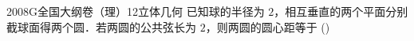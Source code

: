 
\begin{problem}{2008}{G}{全国大纲卷（理）}{12}{立体几何}
已知球的半径为 $2$，相互垂直的两个平面分别截球面得两个圆．若两圆的公共弦长为 $2$，则两圆的圆心距等于 (\hspace{1cm})
\begin{choices}
\end{choices}
\end{problem}

\begin{answer}

\end{answer}

\begin{solutions}

\end{solutions}
